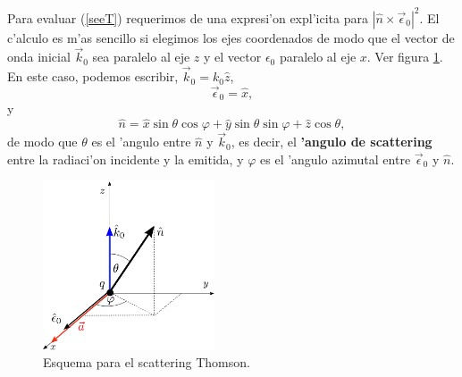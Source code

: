 Para evaluar (\ref{seeT}) requerimos de una expresi'on expl'icita para
$\left|\hat{n}\times\vec{\epsilon}_0\right|^2$. El c'alculo es m'as sencillo si elegimos los ejes coordenados de modo que el vector de onda inicial $\vec{k}_0$ sea paralelo al eje $z$ y el vector $\epsilon_0$ paralelo al eje $x$. Ver figura \ref{fig:thomson}. En este caso, podemos escribir, $\vec{k}_0=k_0\hat{z}$, 
\begin{equation}\label{epsilon0}
\vec\epsilon_0=\hat{x},
\end{equation}
y 
\begin{equation}
\hat{n}=\hat{x}\sin\theta\cos\varphi + \hat{y}\sin\theta\sin\varphi +\hat{z}\cos\theta, \label{ene}
\end{equation}
de modo que $\theta$ es el 'angulo entre $\hat{n}$ y $\vec{k}_0$, es decir, el
\textbf{'angulo de scattering} entre la radiaci'on incidente y la emitida, y $\varphi$ es el 'angulo azimutal entre $\vec{\epsilon}_0$ y
$\hat{n}$.
\begin{figure}[H]
\centerline{\includegraphics[height=5cm]{fig/fig-Thomson-esquema.pdf}}
 \caption{Esquema para el scattering Thomson.}
\label{fig:thomson}
\end{figure}
